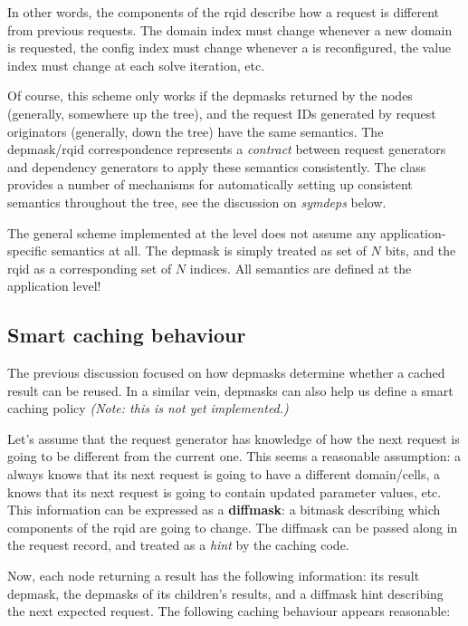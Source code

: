   In other words, the components of the rqid describe how a request is
  different from previous requests. The domain index must change whenever a new
  domain is requested, the config index must change whenever a  is
  reconfigured, the value index must change at each solve iteration, etc.

  Of course, this scheme only works if the depmasks returned by the nodes
  (generally, somewhere up the tree), and the request IDs generated by request
  originators (generally, down the tree) have the same semantics. The
  depmask/rqid correspondence represents a {\em contract} between request
  generators and dependency generators to apply these semantics consistently.
  The  class provides a number of mechanisms for automatically setting
  up consistent semantics throughout the tree, see the discussion on {\em
  symdeps} below.

  The general scheme implemented at the  level does not assume any
  application-specific semantics at all. The depmask is simply treated as set of $N$
  bits, and the rqid as a corresponding set of $N$ indices. All semantics are
  defined at the application level!

\subsection{Smart caching behaviour}

  The previous discussion focused on how depmasks determine whether a cached
  result can be reused. In a similar vein, depmasks can also help us define a
  smart caching policy {\em (Note: this is not yet implemented.)}
  
  Let's assume that the request generator has knowledge of how the next request
  is going to be different from the current one. This seems a reasonable
  assumption: a  always knows that its next request is going to have a
  different domain/cells, a  knows that its next request is going to
  contain updated parameter values, etc. This information can be expressed as a
  {\bf diffmask}: a bitmask describing which components of the rqid are going
  to change. The diffmask can be passed along in the request record, and
  treated as a {\em hint} by the caching code.

  Now, each node returning a result has the following information: its result
  depmask, the depmasks of its children's results, and a diffmask hint 
  describing the next expected request. The following caching behaviour appears reasonable:
  
